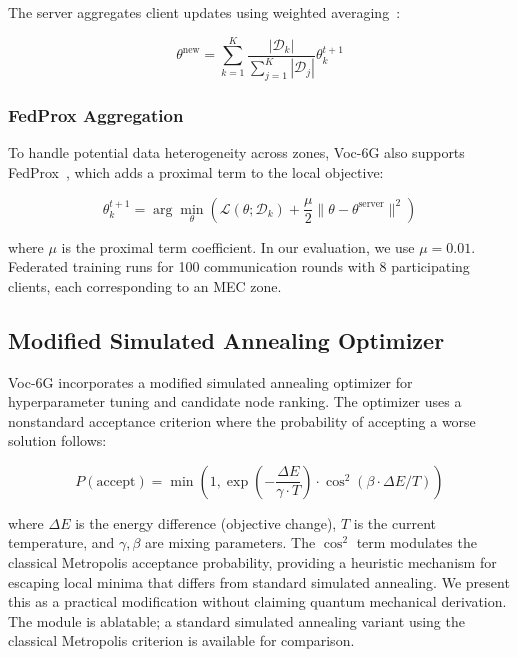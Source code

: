 \documentclass[journal,twoside]{IEEEtran}
\newcommand{\VocSixG}{Voc-6G}
\begin{document}
The server aggregates client updates using weighted averaging~\cite{mcmahan2017fedavg}:

\begin{equation}
\theta^{\text{new}} = \sum_{k=1}^{K} \frac{|\mathcal{D}_k|}{\sum_{j=1}^{K} |\mathcal{D}_j|} \theta_k^{t+1}
\end{equation}

\subsubsection{FedProx Aggregation}

To handle potential data heterogeneity across zones, \VocSixG{} also supports FedProx~\cite{lim2021federated}, which adds a proximal term to the local objective:

\begin{equation}
\theta_k^{t+1} = \arg\min_\theta \left( \mathcal{L}(\theta; \mathcal{D}_k) + \frac{\mu}{2} \|\theta - \theta^{\text{server}}\|^2 \right)
\end{equation}

where $\mu$ is the proximal term coefficient. In our evaluation, we use $\mu=0.01$. Federated training runs for 100 communication rounds with 8 participating clients, each corresponding to an MEC zone.

\subsection{Modified Simulated Annealing Optimizer}
\label{sec:optimizer}

\VocSixG{} incorporates a modified simulated annealing optimizer for hyperparameter tuning and candidate node ranking. The optimizer uses a nonstandard acceptance criterion where the probability of accepting a worse solution follows:

\begin{equation}
P(\text{accept}) = \min\left(1, \exp\left(-\frac{\Delta E}{\gamma \cdot T}\right) \cdot \cos^2(\beta \cdot \Delta E / T)\right)
\label{eq:sa}
\end{equation}

where $\Delta E$ is the energy difference (objective change), $T$ is the current temperature, and $\gamma, \beta$ are mixing parameters. The $\cos^2$ term modulates the classical Metropolis acceptance probability, providing a heuristic mechanism for escaping local minima that differs from standard simulated annealing. We present this as a practical modification without claiming quantum mechanical derivation. The module is ablatable; a standard simulated annealing variant using the classical Metropolis criterion is available for comparison.
\end{document}
